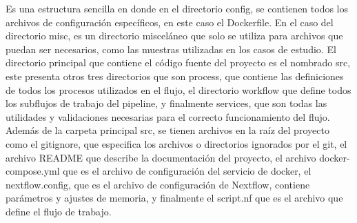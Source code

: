 \documentclass[12pt]{article}
\begin{document}
Es una estructura sencilla en donde en el directorio 
config, se contienen todos los archivos de configuración 
específicos, en este caso el Dockerfile. En el caso 
del directorio misc, es un directorio misceláneo que 
solo se utiliza para archivos que puedan ser necesarios, 
como las muestras utilizadas en los casos de estudio. El 
directorio principal que contiene el código fuente 
del proyecto es el nombrado src, este presenta otros 
tres directorios que son process, que contiene las 
definiciones de todos los procesos utilizados en el flujo, 
el directorio workflow que define todos los subflujos de 
trabajo del pipeline, y finalmente services, que son todas 
las utilidades y validaciones necesarias para el correcto 
funcionamiento del flujo. Además de la carpeta principal src, 
se tienen archivos en la raíz del proyecto como el gitignore, 
que especifica los archivos o directorios ignorados por el 
git, el archivo README que describe la documentación del 
proyecto,  el archivo docker-compose.yml que es el archivo 
de configuración del servicio de docker, el nextflow.config, 
que es el archivo de configuración de Nextflow, contiene 
parámetros y ajustes de memoria, y finalmente el script.nf 
que es el archivo que define el flujo de trabajo.
\end{document}
